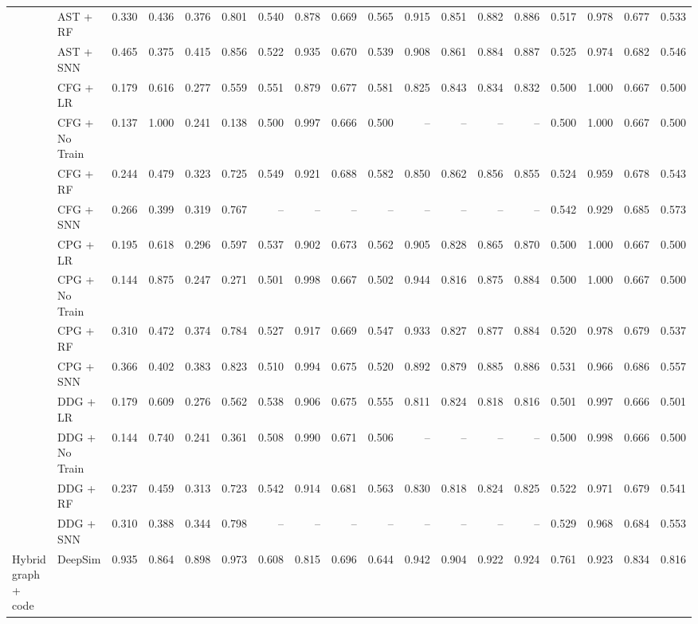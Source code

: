 \documentclass[10pt]{article}
\begin{document}
\begin{landscape}
\begin{table}[p]
{\begin{tabular}{llrrrrrrrrrrrrrrrr}
 & AST + RF & 0.330 & 0.436 & 0.376 & 0.801 & 0.540 & 0.878 & 0.669 & 0.565 & 0.915 & 0.851 & 0.882 & 0.886 & 0.517 & 0.978 & 0.677 & 0.533 \\
 & AST + SNN & 0.465 & 0.375 & 0.415 & 0.856 & 0.522 & 0.935 & 0.670 & 0.539 & 0.908 & 0.861 & 0.884 & 0.887 & 0.525 & 0.974 & 0.682 & 0.546 \\
 & CFG + LR & 0.179 & 0.616 & 0.277 & 0.559 & 0.551 & 0.879 & 0.677 & 0.581 & 0.825 & 0.843 & 0.834 & 0.832 & 0.500 & 1.000 & 0.667 & 0.500 \\
 & CFG + No Train & 0.137 & 1.000 & 0.241 & 0.138 & 0.500 & 0.997 & 0.666 & 0.500 & -- & -- & -- & -- & 0.500 & 1.000 & 0.667 & 0.500 \\
 & CFG + RF & 0.244 & 0.479 & 0.323 & 0.725 & 0.549 & 0.921 & 0.688 & 0.582 & 0.850 & 0.862 & 0.856 & 0.855 & 0.524 & 0.959 & 0.678 & 0.543 \\
 & CFG + SNN & 0.266 & 0.399 & 0.319 & 0.767 & -- & -- & -- & -- & -- & -- & -- & -- & 0.542 & 0.929 & 0.685 & 0.573 \\
 & CPG + LR & 0.195 & 0.618 & 0.296 & 0.597 & 0.537 & 0.902 & 0.673 & 0.562 & 0.905 & 0.828 & 0.865 & 0.870 & 0.500 & 1.000 & 0.667 & 0.500 \\
 & CPG + No Train & 0.144 & 0.875 & 0.247 & 0.271 & 0.501 & 0.998 & 0.667 & 0.502 & 0.944 & 0.816 & 0.875 & 0.884 & 0.500 & 1.000 & 0.667 & 0.500 \\
 & CPG + RF & 0.310 & 0.472 & 0.374 & 0.784 & 0.527 & 0.917 & 0.669 & 0.547 & 0.933 & 0.827 & 0.877 & 0.884 & 0.520 & 0.978 & 0.679 & 0.537 \\
 & CPG + SNN & 0.366 & 0.402 & 0.383 & 0.823 & 0.510 & 0.994 & 0.675 & 0.520 & 0.892 & 0.879 & 0.885 & 0.886 & 0.531 & 0.966 & 0.686 & 0.557 \\
 & DDG + LR & 0.179 & 0.609 & 0.276 & 0.562 & 0.538 & 0.906 & 0.675 & 0.555 & 0.811 & 0.824 & 0.818 & 0.816 & 0.501 & 0.997 & 0.666 & 0.501 \\
 & DDG + No Train & 0.144 & 0.740 & 0.241 & 0.361 & 0.508 & 0.990 & 0.671 & 0.506 & -- & -- & -- & -- & 0.500 & 0.998 & 0.666 & 0.500 \\
 & DDG + RF & 0.237 & 0.459 & 0.313 & 0.723 & 0.542 & 0.914 & 0.681 & 0.563 & 0.830 & 0.818 & 0.824 & 0.825 & 0.522 & 0.971 & 0.679 & 0.541 \\
 & DDG + SNN & 0.310 & 0.388 & 0.344 & 0.798 & -- & -- & -- & -- & -- & -- & -- & -- & 0.529 & 0.968 & 0.684 & 0.553 \\
\midrule
\multirow{1}{*}{Hybrid graph + code} & DeepSim & 0.935 & 0.864 & 0.898 & 0.973 & 0.608 & 0.815 & 0.696 & 0.644 & 0.942 & 0.904 & 0.922 & 0.924 & 0.761 & 0.923 & 0.834 & 0.816 \\

\end{tabular}}
\end{table}
\end{landscape}
\end{document}
